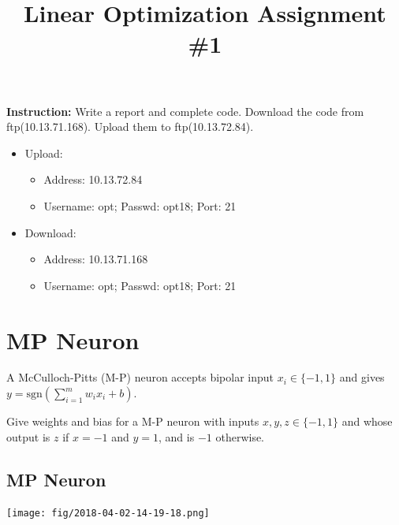 \documentclass[12pt]{article}
\title{\textbf{Linear Optimization Assignment \#1}}
\author{}
\date{}
\providecommand{\tightlist}{%
	\setlength{\itemsep}{0pt}\setlength{\parskip}{0pt}}
\begin{document}
\maketitle

\textbf{\color{NavyBlue}Instruction:} Write a report and complete code.
Download the code from ftp(10.13.71.168). Upload them to ftp(10.13.72.84).
\begin{itemize}
	\tightlist
	\item Upload:
	      \begin{itemize}
		      \tightlist
		      \item    Address: 10.13.72.84
		      \item Username: opt; Passwd:  opt18; Port: 21
	      \end{itemize}
	\item Download:
	      \begin{itemize}
		      \tightlist
		      \item Address: 10.13.71.168
		      \item  Username: opt; Passwd:  opt18; Port: 21
	      \end{itemize}
\end{itemize}



\section{MP Neuron}

A McCulloch-Pitts (M-P) neuron accepts bipolar input $x_i \in \{-1,1\}$ and gives  $y=\mathrm{sgn} (\sum_{i=1}^{m} w_ix_i + b) $.

Give weights and bias for a M-P neuron with inputs
$x,y,z \in \{-1,1\}$ and whose output is  $z$ if $x = -1$ and $y = 1$, and is $-1$ otherwise.

\subsection{MP Neuron}

\begin{center}
	\texttt{[image: fig/2018-04-02-14-19-18.png]}
\end{center}
\end{document}

